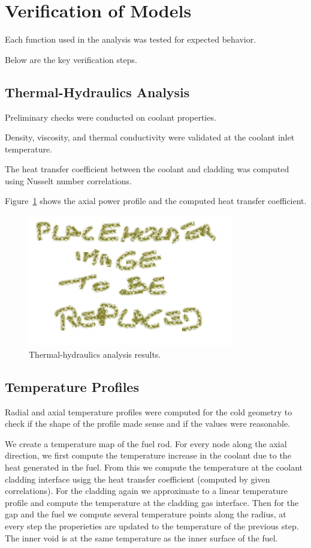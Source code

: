 
\section{Verification of Models}
Each function used in the analysis was tested for expected behavior.

Below are the key verification steps.

\subsection{Thermal-Hydraulics Analysis}
Preliminary checks were conducted on coolant properties.

Density, viscosity, and thermal conductivity were validated at the coolant inlet temperature.

The heat transfer coefficient between the coolant and cladding was computed using Nusselt number correlations.

Figure~\ref{fig:thermal_hydraulics} shows the axial power profile and the computed heat transfer coefficient.

\begin{figure}[H]
\centering
\includegraphics[width=0.8\textwidth]{placeholder.png}
\caption{Thermal-hydraulics analysis results.}
\label{fig:thermal_hydraulics}
\end{figure}

\subsection{Temperature Profiles}
Radial and axial temperature profiles were computed for the cold geometry to check if the shape of the profile made sense and if the values were reasonable.

We create a temperature map of the fuel rod. For every node along the axial direction, we first compute the temperature increase in the coolant due to the heat generated in the fuel. 
From this we compute the temperature at the coolant cladding interface usigg the heat transfer coefficient (computed by given correlations).
For the cladding again we approximate to a linear temperature profile and compute the temperature at the cladding gas interface.
Then for the gap and the fuel we compute several temperature points along the radius, at every step the properieties are updated to the temperature of the previous step.
The inner void is at the same temperature as the inner surface of the fuel. \\


